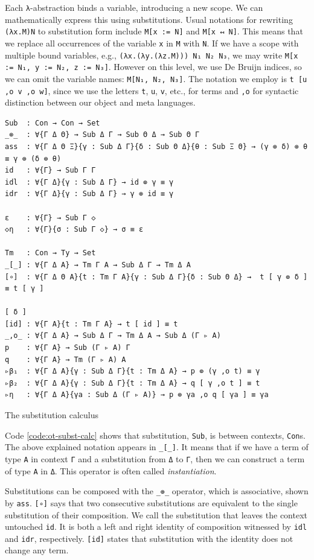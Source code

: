 Each \verb$λ$-abstraction binds a variable, introducing a new scope. We can mathematically express this using substitutions. Usual notations for rewriting \verb$(λx.M)N$ to substitution form include \verb$M[x := N]$ and \verb$M[x ↤ N]$. This means that we replace all occurrences of the variable \verb$x$ in \verb$M$ with \verb$N$. If we have a scope with multiple bound variables, e.g., \verb$(λx.(λy.(λz.M))) N₁ N₂ N₃$, we may write \verb$M[x := N₁, y := N₂, z := N₃]$. However on this level, we use De Bruijn indices, so we can omit the variable names: \verb$M[N₁, N₂, N₃]$. The notation we employ is \verb$t [u ,o v ,o w]$, since we use the letters \verb$t$, \verb$u$, \verb$v$, etc., for terms and \verb$,o$ for syntactic distinction between our object and meta languages.

\begin{listing}[H]
\begin{verbatim}
Sub  : Con → Con → Set
_⊚_  : ∀{Γ Δ Θ} → Sub Δ Γ → Sub Θ Δ → Sub Θ Γ
ass  : ∀{Γ Δ Θ Ξ}{γ : Sub Δ Γ}{δ : Sub Θ Δ}{θ : Sub Ξ Θ} → (γ ⊚ δ) ⊚ θ ≡ γ ⊚ (δ ⊚ θ)
id   : ∀{Γ} → Sub Γ Γ
idl  : ∀{Γ Δ}{γ : Sub Δ Γ} → id ⊚ γ ≡ γ
idr  : ∀{Γ Δ}{γ : Sub Δ Γ} → γ ⊚ id ≡ γ

ε    : ∀{Γ} → Sub Γ ◇
◇η   : ∀{Γ}{σ : Sub Γ ◇} → σ ≡ ε

Tm   : Con → Ty → Set
_[_] : ∀{Γ Δ A} → Tm Γ A → Sub Δ Γ → Tm Δ A
[∘]  : ∀{Γ Δ Θ A}{t : Tm Γ A}{γ : Sub Δ Γ}{δ : Sub Θ Δ} →  t [ γ ⊚ δ ] ≡ t [ γ ]
                                                                           [ δ ]
[id] : ∀{Γ A}{t : Tm Γ A} → t [ id ] ≡ t
_,o_ : ∀{Γ Δ A} → Sub Δ Γ → Tm Δ A → Sub Δ (Γ ▹ A)
p    : ∀{Γ A} → Sub (Γ ▹ A) Γ
q    : ∀{Γ A} → Tm (Γ ▹ A) A
▹β₁  : ∀{Γ Δ A}{γ : Sub Δ Γ}{t : Tm Δ A} → p ⊚ (γ ,o t) ≡ γ
▹β₂  : ∀{Γ Δ A}{γ : Sub Δ Γ}{t : Tm Δ A} → q [ γ ,o t ] ≡ t
▹η   : ∀{Γ Δ A}{γa : Sub Δ (Γ ▹ A)} → p ⊚ γa ,o q [ γa ] ≡ γa
\end{verbatim}
\caption{The substitution calculus}
\label{code:ot-subst-calc}
\end{listing}

Code \ref{code:ot-subst-calc} shows that substitution, \verb$Sub$, is between contexts, \verb$Con$s. The above explained notation appears in \verb$_[_]$. It means that if we have a term of type \verb$A$ in context \verb$Γ$ and a substitution from \verb$Δ$ to \verb$Γ$, then we can construct a term of type \verb$A$ in \verb$Δ$. This operator is often called \textit{instantiation}.

Substitutions can be composed with the \verb$_⊚_$ operator, which is associative, shown by \verb$ass$. \verb$[∘]$ says that two consecutive substitutions are equivalent to the single substitution of their composition. We call the substitution that leaves the context untouched \verb$id$. It is both a left and right identity of composition witnessed by \verb$idl$ and \verb$idr$, respectively. \verb$[id]$ states that substitution with the identity does not change any term.

